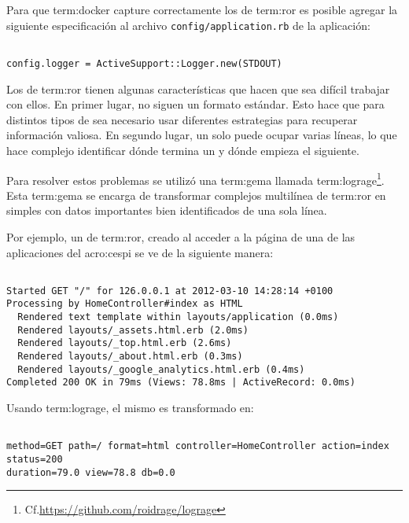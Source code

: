Para que \gls{term:docker} capture correctamente los  de
\gls{term:ror} es posible agregar la siguiente especificación al archivo
\texttt{config/application.rb} de la aplicación:

\begin{lstlisting}

config.logger = ActiveSupport::Logger.new(STDOUT)

\end{lstlisting}

Los  de \gls{term:ror} tienen algunas características que hacen que
sea difícil trabajar con ellos. En primer lugar, no siguen un formato estándar.
Esto hace que para distintos tipos de  sea necesario usar diferentes
estrategias para recuperar información valiosa. En segundo lugar, un solo
 puede ocupar varias líneas, lo que hace complejo identificar dónde
termina un  y dónde empieza el siguiente.

Para resolver estos problemas se utilizó una \gls{term:gema} llamada
\gls{term:lograge}\footnote{Cf.\url{https://github.com/roidrage/lograge}}.
Esta \gls{term:gema} se encarga de transformar complejos  multilínea
de \gls{term:ror} en simples  con datos importantes bien identificados
de una sola línea.

Por ejemplo, un  de \gls{term:ror}, creado al acceder a la página
 de una de las aplicaciones del \gls{acro:cespi} se ve de la siguiente
manera:

\begin{lstlisting}

Started GET "/" for 126.0.0.1 at 2012-03-10 14:28:14 +0100
Processing by HomeController#index as HTML
  Rendered text template within layouts/application (0.0ms)
  Rendered layouts/_assets.html.erb (2.0ms)
  Rendered layouts/_top.html.erb (2.6ms)
  Rendered layouts/_about.html.erb (0.3ms)
  Rendered layouts/_google_analytics.html.erb (0.4ms)
Completed 200 OK in 79ms (Views: 78.8ms | ActiveRecord: 0.0ms)

\end{lstlisting}

Usando \gls{term:lograge}, el mismo  es transformado en:

\begin{lstlisting}

method=GET path=/ format=html controller=HomeController action=index status=200
duration=79.0 view=78.8 db=0.0

\end{lstlisting}

